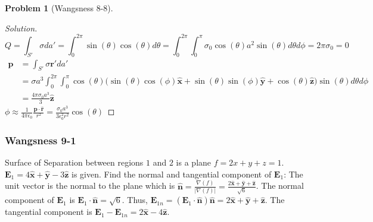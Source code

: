 \documentclass{article}
\theoremstyle{mystyle}
\newtheorem{problem}{Problem}[section]
\begin{document}
\begin{problem}[Wangsness 8-8]
\end{problem}
\begin{proof}[Solution]
\begin{equation*}
    Q = \int_{S'} \sigma da'= \int_{0}^{2\pi} \sin(\theta)\cos(\theta)d\theta = \int_{0}^{2\pi} \int_{0}^{\pi} \sigma_{0} \cos(\theta) a^2 \sin(\theta) d\theta d\phi = 2\pi \sigma_{0} = 0
\end{equation*}
\begin{align*}
    \mathbf{p} &= \int_{S'}\sigma \mathbf{r}' da'\\
    &= \sigma a^{3}\int_{0}^{2\pi} \int_{0}^{\pi} \cos(\theta) \big(\sin(\theta) \cos(\phi) \hat{\mathbf{x}} + \sin(\theta)\sin(\phi) \hat{\mathbf{y}} + \cos(\theta) \hat{\mathbf{z}}\big)\sin(\theta)d\theta d\phi\\
    &= \frac{4\pi \sigma_0 a^3}{3} \hat{\mathbf{z}}
\end{align*}
$\phi \approx \frac{1}{4\pi \epsilon_0} \frac{\mathbf{p}\cdot \hat{\mathbf{r}}}{r^2} = \frac{\sigma_0 a^3}{3\epsilon_0^2 r^2}\cos(\theta)$
\end{proof}
\subsubsection{Wangsness 9-1}
Surface of Separation between regions $1$ and $2$ is a plane $f=2x+y+z=1$. $\mathbf{E}_1 = 4\hat{\mathbf{x}}+\hat{\mathbf{y}}-3\hat{\mathbf{z}}$ is given. Find the normal and tangential component of $\mathbf{E}_1$: The unit vector is the normal to the plane which is $\hat{\mathbf{n}}=\frac{\nabla(f)}{|\nabla(f)|} = \frac{2\hat{\mathbf{x}}+\hat{\mathbf{y}}+\hat{\mathbf{z}}}{\sqrt{6}}$. The normal component of $\mathbf{E}_1$ is $\mathbf{E}_1 \cdot \hat{\mathbf{n}} = \sqrt{6}$. Thus, $\mathbf{E}_{1n} = (\mathbf{E}_1 \cdot \hat{\mathbf{n}})\hat{\mathbf{n}} = 2\hat{\mathbf{x}}+\hat{\mathbf{y}}+\hat{\mathbf{z}}$. The tangential component is $\mathbf{E}_1 - \mathbf{E}_{1n} = 2\hat{\mathbf{x}}-4\hat{\mathbf{z}}$.
\end{document}
